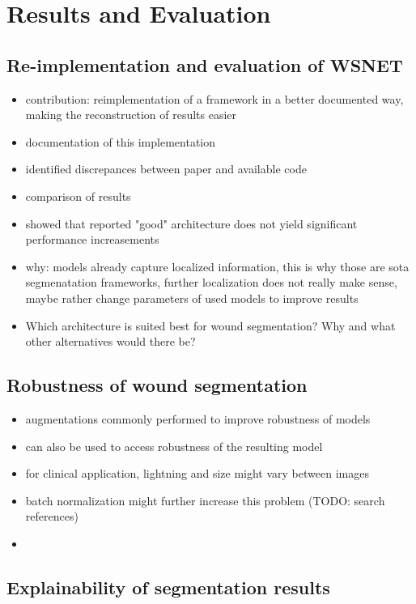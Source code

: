 \section{Results and Evaluation}

\subsection{Re-implementation and evaluation of WSNET}

\begin{itemize}
	\item contribution: reimplementation of a framework in a better documented way, making the reconstruction of results easier
	\item documentation of this implementation
	\item identified discrepances between paper and available code
	\item comparison of results
	\item showed that reported "good" architecture does not yield significant performance increasements
	\item why: models already capture localized information, this is why those are sota segmenatation frameworks, further localization does not really make sense, maybe rather change parameters of used models to improve results
	\item Which architecture is suited best for wound segmentation? Why and what other alternatives would there be?
\end{itemize}

\subsection{Robustness of wound segmentation}

\begin{itemize}
	\item augmentations commonly performed to improve robustness of models
	\item can also be used to access robustness of the resulting model
	\item for clinical application, lightning and size might vary between images
	\item batch normalization might further increase this problem (TODO: search references)
	\item 
\end{itemize}


\subsection{Explainability of segmentation results}